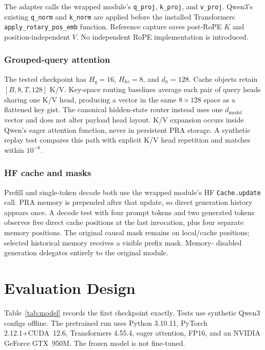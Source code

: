 \documentclass[11pt]{article}
\begin{document}
The adapter calls the wrapped module's \texttt{q\_proj}, \texttt{k\_proj}, and
\texttt{v\_proj}. Qwen3's existing \texttt{q\_norm} and \texttt{k\_norm} are applied before
the installed Transformers \texttt{apply\_rotary\_pos\_emb} function. Reference capture saves
post-RoPE $K$ and position-independent $V$. No independent RoPE implementation is introduced.

\subsubsection{Grouped-query attention}

The tested checkpoint has $H_q=16$, $H_{kv}=8$, and $d_h=128$. Cache objects retain
$[B,8,T,128]$ K/V. Key-space routing baselines average each pair of query heads sharing one K/V
head, producing a vector in the same $8\times128$ space as a flattened key gist. The canonical
hidden-state router instead uses one $d_{\mathrm{model}}$ vector and does not alter payload head
layout. K/V expansion occurs inside Qwen's eager attention function, never in persistent PRA
storage. A synthetic replay test compares this path with explicit K/V head repetition and
matches within $10^{-6}$.

\subsubsection{HF cache and masks}

Prefill and single-token decode both use the wrapped module's HF \texttt{Cache.update} call.
PRA memory is prepended after that update, so direct generation history appears once. A decode
test with four prompt tokens and two generated tokens observes five direct cache positions at
the last invocation, plus four separate memory positions. The original causal mask remains on
local/cache positions; selected historical memory receives a visible prefix mask. Memory-
disabled generation delegates entirely to the original module.

\section{Evaluation Design}

Table~\ref{tab:model} records the first checkpoint exactly. Tests use synthetic Qwen3 configs
offline. The pretrained run uses Python 3.10.11, PyTorch 2.12.1+CUDA~12.6, Transformers 4.55.4,
eager attention, FP16, and an NVIDIA GeForce GTX~950M. The frozen model is not fine-tuned.
\end{document}
